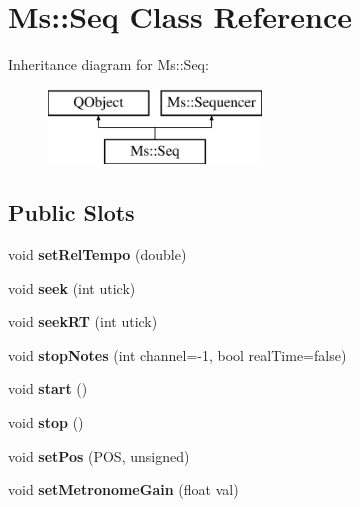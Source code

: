 \hypertarget{class_ms_1_1_seq}{}\section{Ms\+:\+:Seq Class Reference}
\label{class_ms_1_1_seq}
Inheritance diagram for Ms\+:\+:Seq\+:\begin{figure}[H]
\begin{center}
\leavevmode
\includegraphics[height=2.000000cm]{class_ms_1_1_seq}
\end{center}
\end{figure}
\subsection*{Public Slots}
\begin{DoxyCompactItemize}
\item 
\mbox{\label{class_ms_1_1_seq_a1d0d04333fb7a1d13d74c9fb078231a3}} 
void {\bfseries set\+Rel\+Tempo} (double)
\item 
\mbox{\label{class_ms_1_1_seq_a152f4db32b5ef3c4653f550df4ff345d}} 
void {\bfseries seek} (int utick)
\item 
\mbox{\label{class_ms_1_1_seq_a0a3c3df88a97b171eb633499ca6981d7}} 
void {\bfseries seek\+RT} (int utick)
\item 
\mbox{\label{class_ms_1_1_seq_acdc1745b60c3e179d23cd9126ed970ef}} 
void {\bfseries stop\+Notes} (int channel=-\/1, bool real\+Time=false)
\item 
\mbox{\label{class_ms_1_1_seq_a6854cb112a74798107f995485b0e49d5}} 
void {\bfseries start} ()
\item 
\mbox{\label{class_ms_1_1_seq_a9498740067f058300cd380daccd0ea27}} 
void {\bfseries stop} ()
\item 
\mbox{\label{class_ms_1_1_seq_acb2f6cd11fb8fb160aec904769169b58}} 
void {\bfseries set\+Pos} (P\+OS, unsigned)
\item 
\mbox{\label{class_ms_1_1_seq_ad94f8b2956f53a9376d0dd83fff65bd2}} 
void {\bfseries set\+Metronome\+Gain} (float val)
\end{DoxyCompactItemize}
